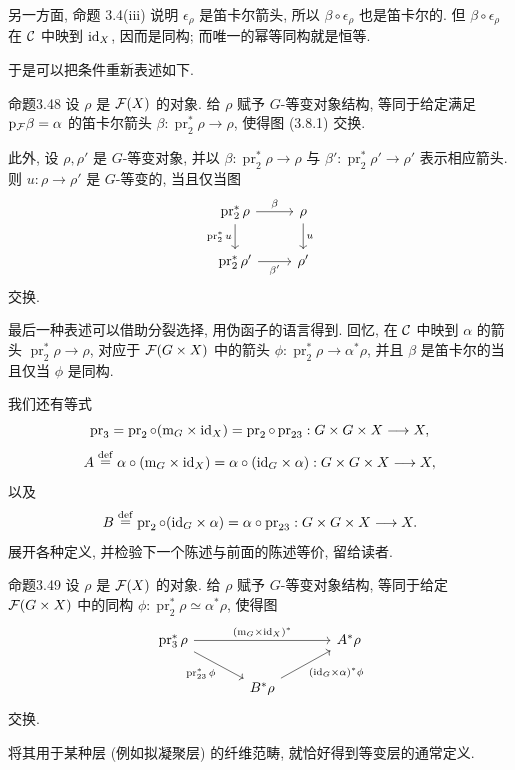 另一方面, 命题 3.4(iii) 说明 $\epsilon_\rho$ 是笛卡尔箭头, 所以 $\beta\circ\epsilon_\rho$ 也是笛卡尔的. 但 $\beta\circ\epsilon_\rho$ 在 $\mathcal C$ 中映到 $\mathrm{id}_X$, 因而是同构; 而唯一的幂等同构就是恒等.

于是可以把条件重新表述如下.

\begin{origstatement}{命题}{3.48}\label{ch03:prop348}
设 $\rho$ 是 $\mathcal F(X)$ 的对象. 给 $\rho$ 赋予 $G$-等变对象结构, 等同于给定满足 $\mathrm p_{\mathcal F}\beta=\alpha$ 的笛卡尔箭头 $\beta:\operatorname{pr}_2^*\rho\to\rho$, 使得图 (3.8.1) 交换.

此外, 设 $\rho,\rho'$ 是 $G$-等变对象, 并以 $\beta:\operatorname{pr}_2^*\rho\to\rho$ 与 $\beta':\operatorname{pr}_2^*\rho'\to\rho'$ 表示相应箭头. 则 $u:\rho\to\rho'$ 是 $G$-等变的, 当且仅当图
\[
\begin{tikzcd}
\operatorname{pr}_2^*\rho\arrow[r,"{\beta}"]\arrow[d,"{\operatorname{pr}_2^*u}"']&\rho\arrow[d,"{u}"]\\
\operatorname{pr}_2^*\rho'\arrow[r,"{\beta'}"']&\rho'
\end{tikzcd}
\]
交换.
\end{origstatement}

最后一种表述可以借助分裂选择, 用伪函子的语言得到. 回忆, 在 $\mathcal C$ 中映到 $\alpha$ 的箭头 $\operatorname{pr}_2^*\rho\to\rho$, 对应于 $\mathcal F(G\times X)$ 中的箭头 $\phi:\operatorname{pr}_2^*\rho\to\alpha^*\rho$, 并且 $\beta$ 是笛卡尔的当且仅当 $\phi$ 是同构.

我们还有等式
\[
\operatorname{pr}_3=\operatorname{pr}_2\circ(\mathrm m_G\times\mathrm{id}_X)
=\operatorname{pr}_2\circ\operatorname{pr}_{23}:G\times G\times X\longrightarrow X,
\]
\[
A\mathrel{\mathop=^{\mathrm{def}}}\alpha\circ(\mathrm m_G\times\mathrm{id}_X)
=\alpha\circ(\mathrm{id}_G\times\alpha):G\times G\times X\longrightarrow X,
\]
以及
\[
B\mathrel{\mathop=^{\mathrm{def}}}\operatorname{pr}_2\circ(\mathrm{id}_G\times\alpha)
=\alpha\circ\operatorname{pr}_{23}:G\times G\times X\longrightarrow X.
\]
展开各种定义, 并检验下一个陈述与前面的陈述等价, 留给读者.

\begin{origstatement}{命题}{3.49}\label{ch03:prop349}
设 $\rho$ 是 $\mathcal F(X)$ 的对象. 给 $\rho$ 赋予 $G$-等变对象结构, 等同于给定 $\mathcal F(G\times X)$ 中的同构 $\phi:\operatorname{pr}_2^*\rho\simeq\alpha^*\rho$, 使得图
\[
\begin{tikzcd}[column sep=large]
\operatorname{pr}_3^*\rho\arrow[rr,"{(\mathrm m_G\times\id_X)^*}"]\arrow[dr,"{\operatorname{pr}_{23}^*\phi}"']&&A^*\rho\\
&B^*\rho\arrow[ur,"{(\id_G\times\alpha)^*\phi}"']&
\end{tikzcd}
\]
交换.
\end{origstatement}

将其用于某种层 (例如拟凝聚层) 的纤维范畴, 就恰好得到等变层的通常定义.

\endgroup
